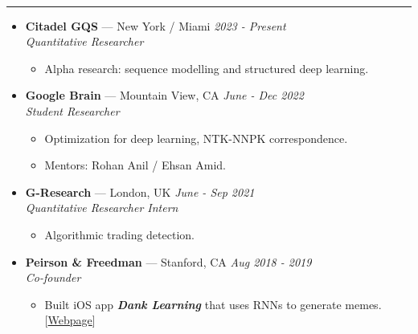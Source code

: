 \documentclass[11pt, oneside]{article}
\newenvironment{ressection}[1]{
	\vspace{4pt}
	{\selectfont\Large\color{Mycolor2}{\textbf{#1}}}
	\vspace{-6.5pt} \\
	\textcolor{Mycolor2}{\rule{\textwidth}{0.7pt}}
	\begin{itemize}
	\vspace{3pt}
}{
	\end{itemize}
}
\newcommand{\ressubitem}{
	\vspace{-4pt}
	\item
}
\newcommand{\resbigitem}[3]{
	\vspace{-5pt}
	\item[]
	\textbf{#1} --- #2 %
	\hfill
	\textit{#3}
}
\newenvironment{ressubsec}[3]{
	\resbigitem{#1}{#2}{#3}
	\vspace{-2pt}
	\begin{itemize}
}{
	\end{itemize}
}
\begin{document}
\begin{ressection}{\textbf{Experience}}
\begin{ressubsec}{Citadel GQS}{New York / Miami}{2023 - Present  \\ Quantitative Researcher}
	\ressubitem{Alpha research: sequence modelling and structured deep learning.}
\end{ressubsec}
\vspace{2pt}
\begin{ressubsec}{Google Brain}{Mountain View, CA}{June - Dec 2022  \\ Student Researcher}
	\ressubitem{Optimization for deep learning, NTK-NNPK correspondence.}
	\ressubitem{Mentors: Rohan Anil / Ehsan Amid.}
\end{ressubsec}
\vspace{2pt}
	\begin{ressubsec}{G-Research}{London, UK}{June - Sep 2021  \\ Quantitative Researcher Intern}
		\ressubitem{Algorithmic trading detection.}
	\end{ressubsec}
	\vspace{2pt}
	\begin{ressubsec}{Peirson \& Freedman}{Stanford, CA}{Aug 2018 - 2019  \\ Co-founder}
\ressubitem{Built iOS app \textbf{\emph{Dank Learning}} that uses RNNs to generate memes. [\href{https://danklearning.com/}{Webpage}]}
	\end{ressubsec}

\end{ressection}

\end{document}
